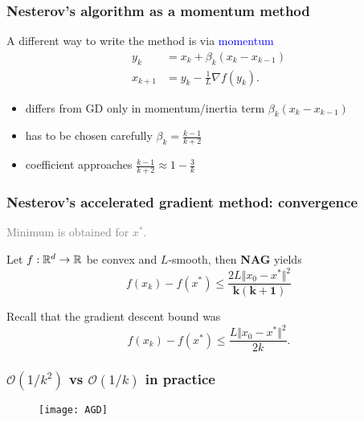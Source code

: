 \documentclass[aspectratio=149]{beamer}
\begin{document}
\begin{frame}
  \frametitle{Nesterov's algorithm as a momentum method}
  A different way to write the method is via \textcolor{blue}{momentum}
  \begin{align}
    y_{k} &= x_k + \beta_k (x_k - x_{k-1}) \\
    x_{k+1} &= y_k - \frac{1}{L} \nabla f(y_k).
  \end{align}

  \begin{itemize}
    \item differs from GD only in momentum/inertia term $\beta_k (x_k - x_{k-1})$
    \item has to be chosen carefully $\beta_k = \frac{k-1}{k+2}$
    \item coefficient approaches $\frac{k-1}{k+2} \approx 1 - \frac{3}{k}$
  \end{itemize}
\end{frame}


\begin{frame}
  \frametitle{Nesterov's accelerated gradient method: convergence}
  \textcolor{gray}{Minimum is obtained for $x^*$.}
  \begin{theorem}
    Let $f: \mathbb{R}^d \to \mathbb{R}$ be convex and $L$-smooth, then \textbf{NAG} yields
    \begin{equation}
      f(x_k) - f(x^*) \le \frac{2L \Vert x_0-x^* \Vert^2}{\bm{k(k+1)}}
    \end{equation}
  \end{theorem}

  Recall that the gradient descent bound was
  \begin{equation}
      f(x_k) - f(x^*) \le \frac{L \Vert x_0-x^* \Vert^2}{2k}.
  \end{equation}
\end{frame}


\begin{frame}
  \frametitle{$\mathcal{O}(1/k^2)$ vs $\mathcal{O}(1/k)$ in practice}

  \begin{figure}[ht]
    \centering
    \texttt{[image: AGD]}
  \end{figure}


\end{frame}
\end{document}
